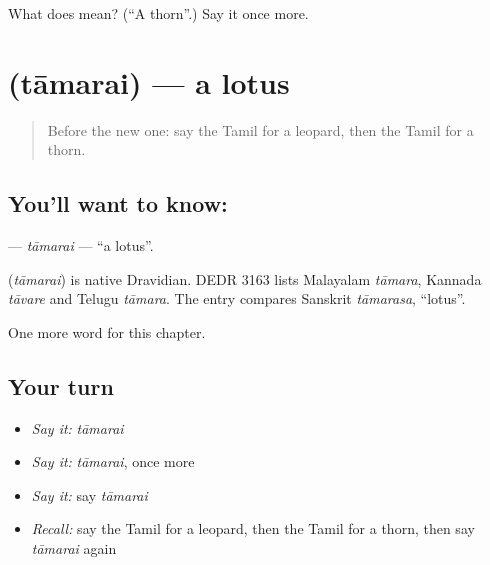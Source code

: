 \begin{tcolorbox}[breakable,colback=teal!4,colframe=teal!35!black,title={Before you move on}]
What does  mean? (\textquotedblleft{}A thorn\textquotedblright{}.) Say it once more.
\end{tcolorbox}
\section[\texorpdfstring{\ta{தாமரை} (tāmarai)}{தாமரை (tāmarai)}]{ (tāmarai) — a lotus}

\label{lesson:TA-C188-tamarai}



\begin{quote}
Before the new one: say the Tamil for a leopard, then the Tamil for a thorn.
\end{quote}

\subsection*{You'll want to know: }
\textbf{} — \emph{tāmarai} — \textquotedblleft{}a lotus\textquotedblright{}.

\begin{cousinweb}
\textbf{} (\emph{tāmarai}) is native Dravidian. DEDR 3163 lists Malayalam \emph{tāmara}, Kannada \emph{tāvare} and Telugu \emph{tāmara}. The entry compares Sanskrit \emph{tāmarasa}, \textquotedblleft{}lotus\textquotedblright{}.
\end{cousinweb}

\begin{grammarlens}[title={What you've built}]
One more word for this chapter.
\end{grammarlens}

\subsection*{Your turn}
\begin{itemize}
\raggedright
  \item \emph{Say it:} \emph{tāmarai}
  \item \emph{Say it:} \emph{tāmarai}, once more
  \item \emph{Say it:} say \emph{tāmarai}
  \item \emph{Recall:} say the Tamil for a leopard, then the Tamil for a thorn, then say \emph{tāmarai} again
\end{itemize}

